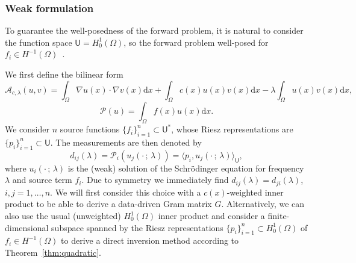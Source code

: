 \documentclass[12pt]{amsart}
\newcommand{\U}{\mathsf{U}}
\begin{document}
\subsubsection{Weak formulation}
To guarantee the well-posedness of the forward problem, it is natural to consider the function space $\mathsf{U} = H_0^1(\Omega)$, so the forward problem well-posed for $f_i \in H^{-1}(\Omega)$~\cite{Victor2014}. 


We first define the bilinear form
$$\mathcal{A}_{c,\lambda}(u,v)=\int_{\Omega} \nabla u(x)\cdot \nabla v(x)\mathrm{d}x + \int_{\Omega} c(x)u(x)v(x)\mathrm{d}x - \lambda \int_{\Omega} u(x)v(x)\mathrm{d}x,$$
$$\mathcal{P}(u) = \int_{\Omega} f(x)u(x)\mathrm{d}x.$$
We consider $n$ source functions $\{f_i\}_{i=1}^n \subset \U^*$, whose Riesz representations are $\{p_i\}_{i=1}^n \subset \mathsf{U}$. 
The measurements are then denoted by
\[
d_{ij}(\lambda) = \mathcal{P}_i(u_j(\cdot\,;\,\lambda)) = \langle p_i, u_j(\cdot \,;\,\lambda)\rangle_\mathsf{U},
\]
where $u_i(\cdot\,;\,\lambda)$ is the (weak) solution of the Schr{\"o}dinger equation for frequency $\lambda$ and source term $f_i$. Due to symmetry we immediately find $d_{ij}(\lambda)=d_{ji}(\lambda)$, $i,j=1,\ldots,n$.  
We will first consider this choice with a $c(x)$-weighted inner product to be able to derive a data-driven Gram matrix $G$. Alternatively, we can also use the usual (unweighted) $H^1_0(\Omega)$ inner product and consider a finite-dimensional subspace spanned by the Riesz representations $\{p_i\}_{i=1}^n \subset H_0^1(\Omega)$ of $f_i \in H^{-1}(\Omega)$ to derive a direct inversion method according to Theorem~\ref{thm:quadratic}.
\end{document}
